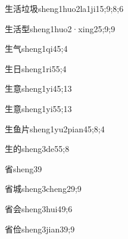 \begin{verbete}{生活垃圾}{sheng1huo2la1ji1}{5;9;8;6}
\end{verbete}

\begin{verbete}{生活型}{sheng1huo2·xing2}{5;9;9}
\end{verbete}

\begin{verbete}{生气}{sheng1qi4}{5;4}
\end{verbete}

\begin{verbete}{生日}{sheng1ri5}{5;4}
\end{verbete}

\begin{verbete}{生意}{sheng1yi4}{5;13}
\end{verbete}

\begin{verbete}{生意}{sheng1yi5}{5;13}
\end{verbete}

\begin{verbete}{生鱼片}{sheng1yu2pian4}{5;8;4}
\end{verbete}

\begin{verbete}{生的}{sheng3de5}{5;8}
\end{verbete}

\begin{verbete}{省}{sheng3}{9}
\end{verbete}

\begin{verbete}{省城}{sheng3cheng2}{9;9}
\end{verbete}

\begin{verbete}{省会}{sheng3hui4}{9;6}
\end{verbete}

\begin{verbete}{省俭}{sheng3jian3}{9;9}
\end{verbete}

